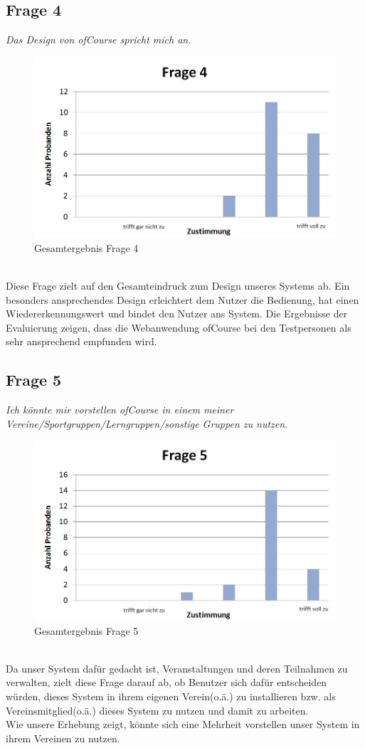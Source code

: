 \subsection{Frage 4}
\begin{center}
	{\it Das Design von ofCourse spricht mich an.}
\end{center}
\begin{figure}[h]
\centering
\includegraphics[width=0.7\linewidth]{img/Frage4}
\caption{Gesamtergebnis Frage 4}
\label{fig:Frage4}
\end{figure}\ \\
Diese Frage zielt auf den Gesamteindruck zum Design unseres Systems ab. Ein besonders ansprechendes Design erleichtert dem Nutzer die Bedienung, hat einen Wiedererkennungswert und bindet den Nutzer ans System. Die Ergebnisse der Evaluierung zeigen, dass die Webanwendung ofCourse bei den Testpersonen als sehr ansprechend empfunden wird.
\newpage
\subsection{Frage 5}
\begin{center}
	{\it Ich könnte mir vorstellen ofCourse in einem meiner Vereine/Sportgruppen/Lerngruppen/sonstige Gruppen zu nutzen.}
\end{center}
\begin{figure}[h]
\centering
\includegraphics[width=0.7\linewidth]{img/Frage5}
\caption{Gesamtergebnis Frage 5}
\label{fig:Frage5}
\end{figure}
\ \\
Da unser System dafür gedacht ist, Veranstaltungen und deren Teilnahmen zu verwalten, zielt diese Frage darauf ab, ob Benutzer sich dafür entscheiden würden, dieses System in ihrem eigenen Verein(o.ä.) zu installieren bzw. als Vereinsmitglied(o.ä.) dieses System zu nutzen und damit zu arbeiten.\\
Wie unsere Erhebung zeigt, könnte sich eine Mehrheit vorstellen unser System in ihrem Vereinen zu nutzen.
\ \\

